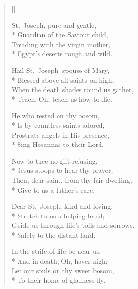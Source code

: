 \newHymn
{}

\begin{verse}[\versewidth]

 St.~Joseph, pure and gentle,\\*
Guardian of the Saviour child,\\
Treading with the virgin mother,\\*
Egypt’s deserts rough and wild.

Hail St.~Joseph, spouse of Mary,\\*
Blessed above all saints on high,\\
When the death shades round us gather,\\*
Teach, Oh, teach us how to die.

He who rested on thy bosom,\\*
Is by countless saints adored,\\
Prostrate angels in His presence,\\*
Sing Hosannas to their Lord.

Now to thee no gift refusing,\\*
Jesus stoops to hear thy prayer,\\
Then, dear saint, from thy fair dwelling,\\*
Give to us a father’s care.

Dear St.~Joseph, kind and loving,\\*
Stretch to us a helping hand;\\
Guide us through life's toils and sorrows,\\*
Safely to the distant land.

In the strife of life be near us,\\*
And in death, Oh, hover nigh;\\
Let our souls on thy sweet bosom,\\*
To their home of gladness fly.

\end{verse}

